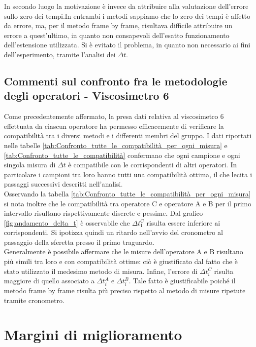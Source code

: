\documentclass[a4paper,11pt,oneside]{article}
\begin{document}
In secondo luogo la motivazione è invece da attribuire alla valutazione dell'errore sullo zero dei tempi.In entrambi i metodi sappiamo che lo zero dei tempi è affetto da errore, ma, per il metodo frame by frame, risultava difficile attribuire un errore a quest'ultimo, in quanto non consapevoli dell'esatto funzionamento dell'estensione utilizzata. Si è evitato il problema, in quanto non necessario ai fini dell'esperimento, tramite l'analisi dei $\Delta t$.


\subsection{Commenti sul confronto fra  le metodologie degli operatori - Viscosimetro 6}
Come precedentemente affermato, la presa dati relativa al viscosimetro 6 effettuata da ciascun operatore ha permesso efficacemente di verificare la compatibilità tra i diversi metodi e i differenti membri del gruppo. I dati riportati nelle tabelle  \ref{tab:Confronto_tutte_le_compatibilità_per_ogni_misura} e  \ref{tab:Confronto_tutte_le_compatibilità} confermano che ogni campione e ogni singola misura di $\Delta t$ è compatibile con le corrispondenti di altri operatori. In particolare i campioni tra loro hanno tutti una compatibilità ottima, il che lecita i passaggi successivi descritti nell'analisi.\\
Osservando la tabella \ref{tab:Confronto_tutte_le_compatibilità_per_ogni_misura} si nota inoltre che le compatibilità tra operatore C e operatore A e B per il primo intervallo risultano rispettivamente discrete e pessime. Dal grafico \ref{fig:andamento_delta_t} è osservabile che $\Delta t^C_1$ risulta essere inferiore ai corrispondenti. Si ipotizza quindi un ritardo nell'avvio del cronometro al passaggio della sferetta presso il primo traguardo.\\
Generalmente è possibile affermare che le misure dell'operatore A e B risultano più simili tra loro e con compatibilità ottime: ciò è giustificato dal fatto che è stato utilizzato il medesimo metodo di misura.
Infine, l'errore di $\Delta t^C_i$ risulta maggiore di quello associato a $\Delta t^A_i$ e $\Delta t^B_i$. Tale fatto è giustificabile poiché il metodo frame by frame risulta più preciso rispetto al metodo di misure ripetute tramite cronometro. %


\section{Margini di miglioramento}
\end{document}
